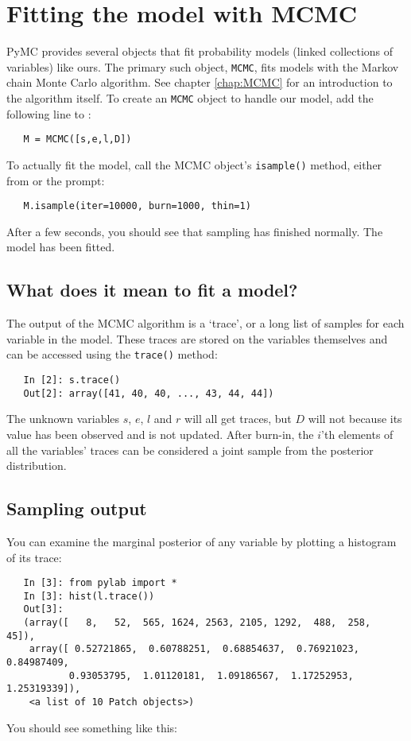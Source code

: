 \section*{Fitting the model with MCMC}

PyMC provides several objects that fit probability models (linked collections of variables) like ours. The primary such object, \texttt{MCMC}, fits models with the Markov chain Monte Carlo algorithm. See chapter \ref{chap:MCMC} for an introduction to the algorithm itself. To create an \texttt{MCMC} object to handle our model, add the following line to :
\begin{verbatim}
   M = MCMC([s,e,l,D])
\end{verbatim}
To actually fit the model, call the MCMC object's \texttt{isample()} method, either from  or the prompt:
\begin{verbatim}
   M.isample(iter=10000, burn=1000, thin=1)
\end{verbatim}
After a few seconds, you should see that sampling has finished normally. The model has been fitted.

\subsection*{What does it mean to fit a model?}
The output of the MCMC algorithm is a `trace', or a long list of samples for each variable in the model. These traces are stored on the variables themselves and can be accessed using the \texttt{trace()} method:
\begin{verbatim}
   In [2]: s.trace()
   Out[2]: array([41, 40, 40, ..., 43, 44, 44])
\end{verbatim}
The unknown variables $s$, $e$, $l$ and $r$ will all get traces, but $D$ will not because its value has been observed and is not updated. After burn-in, the $i$'th elements of all the variables' traces can be considered a joint sample from the posterior distribution.


\subsection*{Sampling output} 
You can examine the marginal posterior of any variable by plotting a histogram of its trace:
\begin{verbatim}
   In [3]: from pylab import *
   In [3]: hist(l.trace())
   Out[3]: 
   (array([   8,   52,  565, 1624, 2563, 2105, 1292,  488,  258,   45]),
    array([ 0.52721865,  0.60788251,  0.68854637,  0.76921023,  0.84987409,
           0.93053795,  1.01120181,  1.09186567,  1.17252953,  1.25319339]),
    <a list of 10 Patch objects>)
\end{verbatim}
You should see something like this:
\begin{center}
\end{center}

